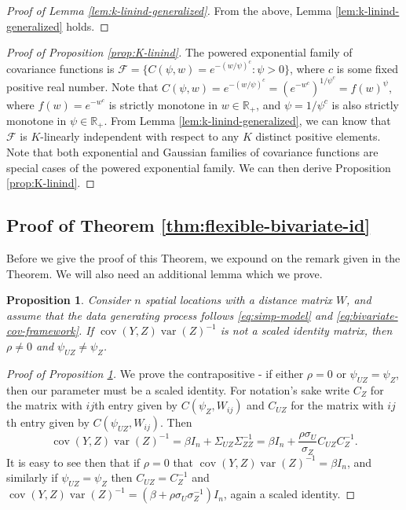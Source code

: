 \documentclass[11pt]{article}
\newtheorem{proposition}{Proposition}
\theoremstyle{definition}
\theoremstyle{remark}
\DeclareMathOperator{\var}{var}
\DeclareMathOperator{\cov}{cov}
\begin{document}
\begin{proof}[Proof of Lemma \ref{lem:k-linind-generalized}]
From the above, Lemma \ref{lem:k-linind-generalized} holds. 
\end{proof}

\begin{proof}[Proof of Proposition \ref{prop:K-linind}]

The powered exponential family of covariance functions is $\mathcal{F} = \{C(\psi, w) = e^{-(w/\psi)^c}: \psi > 0\}$, where $c$ is some fixed positive real number. 
Note that 
$
C(\psi, w)  = e^{-(w/\psi)^c} = (e^{-w^c})^{1/\psi^c} = f(w)^{\psi}, 
$
where
$f(w) = e^{-w^c}$ is strictly monotone in $w\in \mathbb{R}_+$, 
and $\psi = 1/\psi^c$ is also strictly monotone in $\psi\in \mathbb{R}_+$. 
From Lemma \ref{lem:k-linind-generalized}, 
we can know that $\mathcal{F}$ is $K$-linearly independent with respect to any $K$ distinct positive elements.
Note that both exponential and Gaussian families of covariance functions are special cases of the powered exponential family. 
We can then derive Proposition \ref{prop:K-linind}. 
\end{proof}



\subsection{Proof of Theorem \ref{thm:flexible-bivariate-id}}

Before we give the proof of this Theorem, we expound on the remark given in the Theorem. We will also need an additional lemma which we prove.

\begin{proposition}\label{prop:bivariate-scaled-identity}
Consider $n$ spatial locations with a distance matrix $W$, 
and assume that the data generating process follows \eqref{eq:simp-model} and \eqref{eq:bivariate-cov-framework}. If $\cov(Y,Z)\var(Z)^{-1}$ is not a scaled identity matrix, then $\rho \neq 0$ and $\psi_{UZ} \neq \psi_Z$.
\end{proposition}
\begin{proof}[Proof of Proposition \ref{prop:bivariate-scaled-identity}]
We prove the contrapositive - if either $\rho=0$ or $\psi_{UZ} = \psi_Z$, then our parameter must be a scaled identity. For notation's sake write $C_{Z}$ for the matrix with $ij$th entry given by $C(\psi_{Z}, W_{ij})$ and $C_{UZ}$ for the matrix with $ij$th entry given by $C(\psi_{UZ}, W_{ij})$. Then \[ \cov(Y,Z)\var(Z)^{-1} = \beta I_n + \Sigma_{UZ}\Sigma_{ZZ}^{-1} = \beta I_n + \frac{\rho \sigma_U}{\sigma_Z} C_{UZ}C_Z^{-1}.\]
It is easy to see then that if $\rho=0$ that $\cov(Y,Z)\var(Z)^{-1}=\beta I_n$, and similarly if $\psi_{UZ} = \psi_Z$ then $C_{UZ} = C_Z^{-1}$ and $\cov(Y,Z)\var(Z)^{-1} = (\beta + \rho\sigma_U\sigma_Z^{-1})I_n$, again a scaled identity.
\end{proof}
\end{document}
